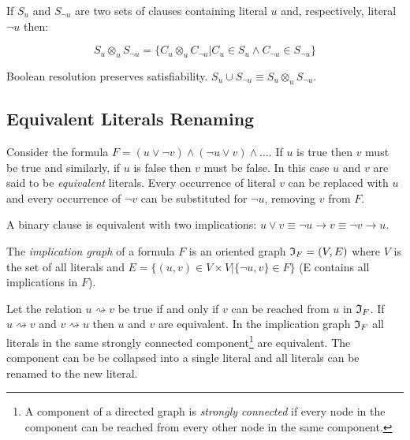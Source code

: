 \begin{mydef}
  If $S_u$ and $S_{\neg u}$ are two sets of clauses containing
  literal $u$ and, respectively, literal $\neg u$ then:

  $$S_u \otimes_{u} S_{\neg u} = \{ C_u \otimes_{u} C_{\neg u} |
  C_u \in S_u \land C_{\neg u} \in S_{\neg u}\}$$
\end{mydef}

\begin{myprop}
  Boolean resolution preserves satisfiability. $S_u \cup S_{\neg u}
  \equiv S_u \otimes_{u} S_{\neg u}$.
\end{myprop}

\subsection{Equivalent Literals Renaming}
\label{ssec:eqlr}

Consider the formula $F = (u \lor \neg v) \land (\neg u \lor v) \land \ldots$.
If $u$ is true then $v$ must be true and similarly, if $u$ is false
then $v$ must be false. In this case $u$ and $v$ are said to be
\emph{equivalent} literals. Every occurrence of literal $v$ can be
replaced with $u$ and every occurrence of $\neg v$ can be
substituted for $\neg u$, removing $v$ from $F$.

\begin{myprop}
  A binary clause is equivalent with two implications:
  $u \lor v \equiv \neg u \rightarrow v \equiv \neg v \rightarrow u$.
\end{myprop}

\begin{mydef}
  The \emph{implication graph} of a formula $F$ is an oriented graph
  $\mathfrak{I}_F = (V, E)$ where $V$ is the set of all literals and $E = \{(u,
  v) \in V \times V | \{\neg u, v\} \in F\}$ (E contains all implications in $F$).
\end{mydef}

Let the relation $u \rightsquigarrow v$ be true if and only if
$v$ can be reached from $u$ in $\mathfrak{I}_F$.  If $u \rightsquigarrow v$
and $v \rightsquigarrow u$ then $u$ and $v$ are equivalent.  In the
implication graph $\mathfrak{I}_F$ all literals in the same strongly connected
component\footnote{A component of a directed graph is \emph{strongly
connected} if every node in the component can be reached from every
other node in the same component.} are equivalent. The component
can be be collapsed into a single literal and all literals can be
renamed to the new literal.

